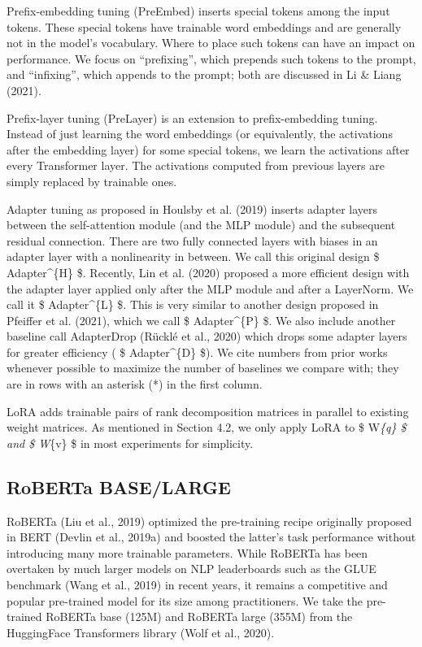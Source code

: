 \documentclass[conference]{IEEEtran}
\begin{document}
Prefix-embedding tuning (PreEmbed) inserts special tokens among the input tokens. These special tokens have trainable word embeddings and are generally not in the model's vocabulary. Where to place such tokens can have an impact on performance. We focus on “prefixing”, which prepends such tokens to the prompt, and “infixing”, which appends to the prompt; both are discussed in Li \& Liang (2021).

Prefix-layer tuning (PreLayer) is an extension to prefix-embedding tuning. Instead of just learning the word embeddings (or equivalently, the activations after the embedding layer) for some special tokens, we learn the activations after every Transformer layer. The activations computed from previous layers are simply replaced by trainable ones.

Adapter tuning as proposed in Houlsby et al. (2019) inserts adapter layers between the self-attention module (and the MLP module) and the subsequent residual connection. There are two fully connected layers with biases in an adapter layer with a nonlinearity in between. We call this original design  \$ Adapter\textasciicircum{}\{H\} \$. Recently, Lin et al. (2020) proposed a more efficient design with the adapter layer applied only after the MLP module and after a LayerNorm. We call it  \$ Adapter\textasciicircum{}\{L\} \$. This is very similar to another design proposed in Pfeiffer et al. (2021), which we call  \$ Adapter\textasciicircum{}\{P\} \$. We also include another baseline call AdapterDrop (Rücklé et al., 2020) which drops some adapter layers for greater efficiency ( \$ Adapter\textasciicircum{}\{D\} \$). We cite numbers from prior works whenever possible to maximize the number of baselines we compare with; they are in rows with an asterisk (*) in the first column.

LoRA adds trainable pairs of rank decomposition matrices in parallel to existing weight matrices. As mentioned in Section 4.2, we only apply LoRA to  \$ W\textit{\{q\} \$ and  \$ W}\{v\} \$ in most experiments for simplicity.




\subsection{RoBERTa BASE/LARGE}

RoBERTa (Liu et al., 2019) optimized the pre-training recipe originally proposed in BERT (Devlin et al., 2019a) and boosted the latter's task performance without introducing many more trainable parameters. While RoBERTa has been overtaken by much larger models on NLP leaderboards such as the GLUE benchmark (Wang et al., 2019) in recent years, it remains a competitive and popular pre-trained model for its size among practitioners. We take the pre-trained RoBERTa base (125M) and RoBERTa large (355M) from the HuggingFace Transformers library (Wolf et al., 2020).
\end{document}
